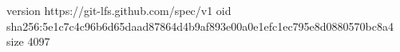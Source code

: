 version https://git-lfs.github.com/spec/v1
oid sha256:5e1c7c4c96b6d65daad87864d4b9af893e00a0e1efc1ec795e8d0880570bc8a4
size 4097
